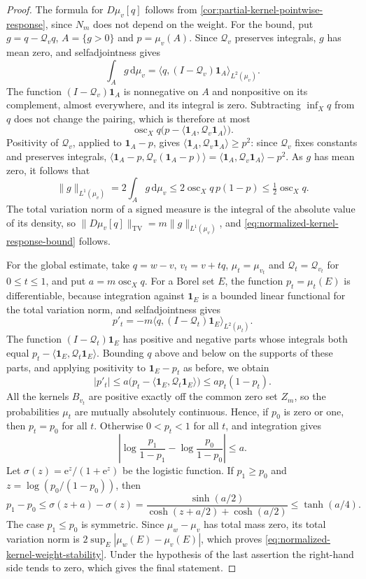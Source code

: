 \begin{proof}
The formula for $D\mu_v[q]$ follows from \cref{cor:partial-kernel-pointwise-response}, since $N_m$ does not depend on the weight. For the bound, put $g=q-\mathcal Q_vq$, $A=\{g>0\}$ and $p=\mu_v(A)$. Since $\mathcal Q_v$ preserves integrals, $g$ has mean zero, and selfadjointness gives
\[
 \int_Ag\,\mathrm{d}\mu_v
   =\langle q,(I-\mathcal Q_v)\mathbf1_A\rangle_{L^2(\mu_v)}.
\]
The function $(I-\mathcal Q_v)\mathbf1_A$ is nonnegative on $A$ and nonpositive on its complement, almost everywhere, and its integral is zero. Subtracting $\inf_Xq$ from $q$ does not change the pairing, which is therefore at most
\[
 \operatorname{osc}_Xq
    \bigl(p-\langle\mathbf1_A,\mathcal Q_v\mathbf1_A\rangle\bigr).
\]
Positivity of $\mathcal Q_v$, applied to $\mathbf1_A-p$, gives
$\langle\mathbf1_A,\mathcal Q_v\mathbf1_A\rangle\geq p^2$: since $\mathcal Q_v$ fixes constants and preserves integrals, $\langle\mathbf1_A-p,\mathcal Q_v(\mathbf1_A-p)\rangle=\langle\mathbf1_A,\mathcal Q_v\mathbf1_A\rangle-p^2$. As $g$ has mean zero, it follows that
\[
 \|g\|_{L^1(\mu_v)}
 =2\int_Ag\,\mathrm{d}\mu_v
 \leq2\operatorname{osc}_Xq\,p(1-p)
 \leq\tfrac12\operatorname{osc}_Xq.
\]
The total variation norm of a signed measure is the integral of the absolute value of its density, so $\|D\mu_v[q]\|_{\mathrm{TV}}=m\|g\|_{L^1(\mu_v)}$, and \eqref{eq:normalized-kernel-response-bound} follows.

For the global estimate, take $q=w-v$, $v_t=v+tq$, $\mu_t=\mu_{v_t}$ and $\mathcal Q_t=\mathcal Q_{v_t}$ for $0\leq t\leq1$, and put $a=m\operatorname{osc}_Xq$. For a Borel set $E$, the function $p_t=\mu_t(E)$ is differentiable, because integration against $\mathbf1_E$ is a bounded linear functional for the total variation norm, and selfadjointness gives
\[
 p'_t=-m\langle q,(I-\mathcal Q_t)\mathbf1_E\rangle_{L^2(\mu_t)}.
\]
The function $(I-\mathcal Q_t)\mathbf1_E$ has positive and negative parts whose integrals both equal $p_t-\langle\mathbf1_E,\mathcal Q_t\mathbf1_E\rangle$. Bounding $q$ above and below on the supports of these parts, and applying positivity to $\mathbf1_E-p_t$ as before, we obtain
\[
 |p'_t|\leq a\bigl(p_t-\langle\mathbf1_E,\mathcal Q_t\mathbf1_E\rangle\bigr)
          \leq ap_t(1-p_t).
\]
All the kernels $B_{v_t}$ are positive exactly off the common zero set $Z_m$, so the probabilities $\mu_t$ are mutually absolutely continuous. Hence, if $p_0$ is zero or one, then $p_t=p_0$ for all $t$. Otherwise $0<p_t<1$ for all $t$, and integration gives
\[
 \left|\log\frac{p_1}{1-p_1}-\log\frac{p_0}{1-p_0}\right|\leq a.
\]
Let $\sigma(z)=\mathrm{e}^z/(1+\mathrm{e}^z)$ be the logistic function. If $p_1\geq p_0$ and $z=\log(p_0/(1-p_0))$, then
\[
 p_1-p_0\leq\sigma(z+a)-\sigma(z)
 =\frac{\sinh(a/2)}{\cosh(z+a/2)+\cosh(a/2)}
 \leq\tanh(a/4).
\]
The case $p_1\leq p_0$ is symmetric. Since $\mu_w-\mu_v$ has total mass zero, its total variation norm is $2\sup_E|\mu_w(E)-\mu_v(E)|$, which proves \eqref{eq:normalized-kernel-weight-stability}. Under the hypothesis of the last assertion the right-hand side tends to zero, which gives the final statement.
\end{proof}

